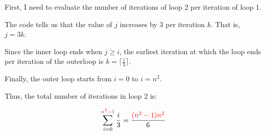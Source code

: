 \documentclass[12pt]{article}
\begin{document}
\begin{enumerate}[1.]
\begin{enumerate}[a)]
\begin{mdframed}
            First, I need to evaluate the number of iterations of loop 2 per iteration of loop 1.

            \bigskip

            The code tells us that the value of $j$ increases by 3 per iteration $k$. That is, $j = 3k$.

            \bigskip

            Since the inner loop ends when $j \geq i$, the earliest iteration at which
            the loop ends per iteration of the outerloop is $k = \lceil \frac{i}{3} \rceil$.

            \bigskip

            Finally, the outer loop starts from $i = 0$ to $i = n^2$.

            \bigskip

            Thus, the total number of iterations in loop 2 is:

            \setcounter{equation}{0}
            \begin{align}
                \sum\limits_{i=0}^{\color{red}n^2-1\color{black}} \frac{i}{3} = \frac{\color{red}(n^2-1)n^2\color{black}}{6}
            \end{align}

            \bigskip

        \end{mdframed}

    \end{enumerate}

    \bigskip

\end{enumerate}
\end{document}
